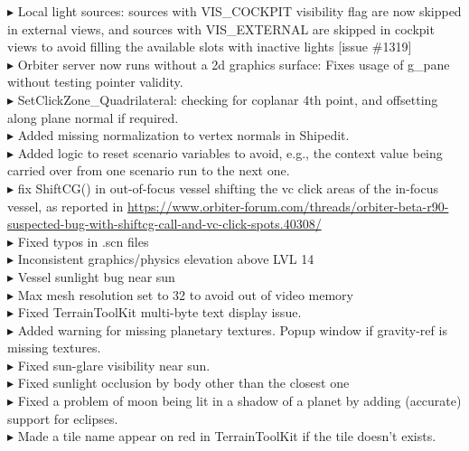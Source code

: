 \documentclass[Orbiter User Manual.tex]{subfiles}
\begin{document}
$\blacktriangleright$ Local light sources: sources with VIS\_COCKPIT visibility flag are now skipped in external views, and sources with VIS\_EXTERNAL are skipped in cockpit views to avoid filling the available slots with inactive lights [issue \#1319]\\
$\blacktriangleright$ Orbiter server now runs without a 2d graphics surface: Fixes usage of g\_pane without testing pointer validity.\\
$\blacktriangleright$ SetClickZone\_Quadrilateral: checking for coplanar 4th point, and offsetting along plane normal if required.\\
$\blacktriangleright$ Added missing normalization to vertex normals in Shipedit.\\
$\blacktriangleright$ Added logic to reset scenario variables to avoid, e.g., the context value being carried over from one scenario run to the next one.\\
$\blacktriangleright$ fix ShiftCG() in out-of-focus vessel shifting the vc click areas of the in-focus vessel, as reported in \url{https://www.orbiter-forum.com/threads/orbiter-beta-r90-suspected-bug-with-shiftcg-call-and-vc-click-spots.40308/}\\
$\blacktriangleright$ Fixed typos in .scn files\\
$\blacktriangleright$ Inconsistent graphics/physics elevation above LVL 14\\
$\blacktriangleright$ Vessel sunlight bug near sun\\
$\blacktriangleright$ Max mesh resolution set to 32 to avoid out of video memory\\
$\blacktriangleright$ Fixed TerrainToolKit multi-byte text display issue.\\
$\blacktriangleright$ Added warning for missing planetary textures. Popup window if gravity-ref is missing textures.\\
$\blacktriangleright$ Fixed sun-glare visibility near sun.\\
$\blacktriangleright$ Fixed sunlight occlusion by body other than the closest one\\
$\blacktriangleright$ Fixed a problem of moon being lit in a shadow of a planet by adding (accurate) support for eclipses.\\
$\blacktriangleright$ Made a tile name appear on red in TerrainToolKit if the tile doesn't exists.\\
\end{document}
